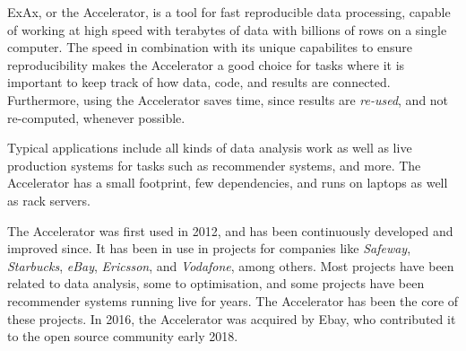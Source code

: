 
ExAx, or the Accelerator, is a tool for fast reproducible data
processing, capable of working at high speed with terabytes of data
with billions of rows on a single computer.  The speed in combination
with its unique capabilites to ensure reproducibility makes the
Accelerator a good choice for tasks where it is important to keep
track of how data, code, and results are connected.  Furthermore,
using the Accelerator saves time, since results are \emph{re-used},
and not re-computed, whenever possible.

Typical applications include all kinds of data analysis work as well
as live production systems for tasks such as recommender systems, and
more.  The Accelerator has a small footprint, few dependencies, and
runs on laptops as well as rack servers.

The Accelerator was first used in 2012, and has been continuously developed and
improved since.  It has been in use in projects for companies like
\textsl{Safeway}, \textsl{Starbucks}, \textsl{eBay}, \textsl{Ericsson},
and \textsl{Vodafone}, among others.  Most projects have been related
to data analysis, some to optimisation, and some projects have been
recommender systems running live for years.  The Accelerator has been
the core of these projects.  In 2016, the Accelerator was acquired by
Ebay, who contributed it to the open source community early 2018.

